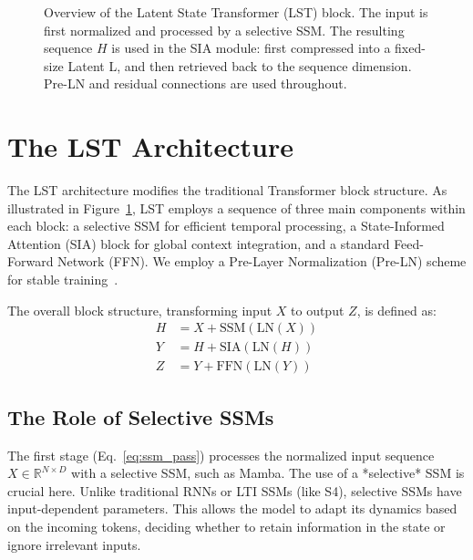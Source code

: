 \documentclass[10pt,twocolumn,letterpaper]{article}
\begin{document}
\begin{figure}[t]
    \caption{Overview of the Latent State Transformer (LST) block. The input is first normalized and processed by a selective SSM. The resulting sequence \(H\) is used in the SIA module: first compressed into a fixed-size Latent L, and then retrieved back to the sequence dimension. Pre-LN and residual connections are used throughout.}
    \label{fig:architecture}
\end{figure}

\section{The LST Architecture}

The LST architecture modifies the traditional Transformer block structure. As illustrated in Figure~\ref{fig:architecture}, LST employs a sequence of three main components within each block: a selective SSM for efficient temporal processing, a State-Informed Attention (SIA) block for global context integration, and a standard Feed-Forward Network (FFN). We employ a Pre-Layer Normalization (Pre-LN) scheme for stable training~\cite{xiong2020layer}.

The overall block structure, transforming input \(X\) to output \(Z\), is defined as:
\begin{align}
H &= X + \text{SSM}(\text{LN}(X)) \label{eq:ssm_pass}\\
Y &= H + \text{SIA}(\text{LN}(H)) \label{eq:sia_pass}\\
Z &= Y + \text{FFN}(\text{LN}(Y)) \label{eq:ffn_pass}
\end{align}

\subsection{The Role of Selective SSMs}

The first stage (Eq.~\ref{eq:ssm_pass}) processes the normalized input sequence \(X\in\mathbb{R}^{N\times D}\) with a selective SSM, such as Mamba. The use of a *selective* SSM is crucial here. Unlike traditional RNNs or LTI SSMs (like S4), selective SSMs have input-dependent parameters. This allows the model to adapt its dynamics based on the incoming tokens, deciding whether to retain information in the state or ignore irrelevant inputs.
\end{document}
